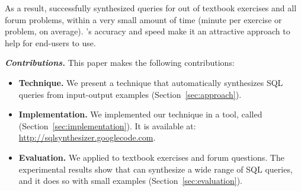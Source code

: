 As a result, \ourtool successfully synthesized queries
for \solexnum out of \exnum textbook exercises and
all \pnum forum problems, within a very
small amount of time (\avgtime minute per exercise or problem, on average).
\ourtool's accuracy and speed make it an attractive
approach to help for end-users to use.%


\vspace{1mm}
\noindent\textbf{\textit{Contributions.}}
This paper makes the following contributions:

\begin{itemize}

\item \textbf{Technique.} We present a technique that automatically
synthesizes SQL queries from input-output examples
(Section~\ref{sec:approach}).

\item \textbf{Implementation.} We implemented our technique in a
tool, called \ourtool (Section~\ref{sec:implementation}). It is
available at: \url{http://sqlsynthesizer.googlecode.com}.

\item \textbf{Evaluation.} We applied \ourtool
to \exnum textbook exercises and \pnum 
forum questions.
The experimental results show that \ourtool can synthesize
a wide range of SQL queries, and it does so with
small examples (Section~\ref{sec:evaluation}).
\end{itemize}
